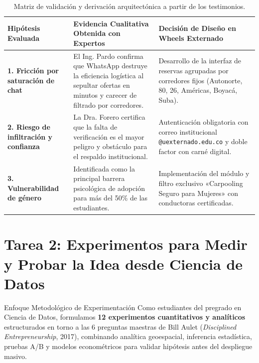 \documentclass[11pt,a4paper]{article}
\begin{document}
\begin{table}[h!]
\centering
\small
\begin{tabularx}{\textwidth}{p{3.5cm} X p{4.5cm}}
\toprule
\textbf{Hipótesis Evaluada} & \textbf{Evidencia Cualitativa Obtenida con Expertos} & \textbf{Decisión de Diseño en Wheels Externado} \\
\midrule
\textbf{1. Fricción por saturación de chat} & El Ing. Pardo confirma que WhatsApp destruye la eficiencia logística al sepultar ofertas en minutos y carecer de filtrado por corredores. & Desarrollo de la interfaz de reservas agrupadas por corredores fijos (Autonorte, 80, 26, Américas, Boyacá, Suba). \\
\midrule
\textbf{2. Riesgo de infiltración y confianza} & La Dra. Forero certifica que la falta de verificación es el mayor peligro y obstáculo para el respaldo institucional. & Autenticación obligatoria con correo institucional \texttt{@uexternado.edu.co} y doble factor con carné digital. \\
\midrule
\textbf{3. Vulnerabilidad de género} & Identificada como la principal barrera psicológica de adopción para más del 50\% de las estudiantes. & Implementación del módulo y filtro exclusivo «Carpooling Seguro para Mujeres» con conductoras certificadas. \\
\bottomrule
\end{tabularx}
\caption{Matriz de validación y derivación arquitectónica a partir de los testimonios.}
\end{table}

\newpage
\section{Tarea 2: Experimentos para Medir y Probar la Idea desde Ciencia de Datos}

\begin{externadobox}{Enfoque Metodológico de Experimentación}
Como estudiantes del pregrado en Ciencia de Datos, formulamos \textbf{12 experimentos cuantitativos y analíticos} estructurados en torno a las 6 preguntas maestras de Bill Aulet (\textit{Disciplined Entrepreneurship}, 2017), combinando analítica geoespacial, inferencia estadística, pruebas A/B y modelos econométricos para validar hipótesis antes del despliegue masivo.
\end{externadobox}
\end{document}
